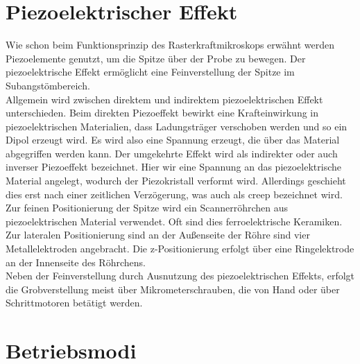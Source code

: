 \section{Piezoelektrischer Effekt}
Wie schon beim Funktionsprinzip des Rasterkraftmikroskops erwähnt werden Piezoelemente genutzt, um die Spitze über der Probe zu bewegen. Der piezoelektrische Effekt ermöglicht eine Feinverstellung der Spitze im Subangstömbereich.  \\
Allgemein wird zwischen direktem und indirektem piezoelektrischen Effekt unterschieden. Beim direkten Piezoeffekt bewirkt eine Krafteinwirkung in piezoelektrischen Materialien, dass Ladungsträger verschoben werden und so ein Dipol erzeugt wird. Es wird also eine Spannung erzeugt, die über das Material abgegriffen werden kann. Der umgekehrte Effekt wird als indirekter oder auch inverser Piezoeffekt bezeichnet. Hier wir eine Spannung an das piezoelektrische Material angelegt, wodurch der Piezokristall verformt wird. Allerdings geschieht dies erst nach einer zeitlichen Verzögerung, was auch als \dq creep \dq bezeichnet wird.  \\
Zur feinen Positionierung der Spitze wird ein Scannerröhrchen aus piezoelektrischen Material verwendet. Oft sind dies ferroelektrische Keramiken. Zur lateralen Positionierung sind an der Außenseite der Röhre sind vier Metallelektroden angebracht. Die z-Positionierung erfolgt über eine Ringelektrode an der Innenseite des Röhrchens.
\\
Neben der Feinverstellung durch Ausnutzung des piezoelektrischen Effekts, erfolgt die Grobverstellung meist über Mikrometerschrauben, die von Hand oder über Schrittmotoren betätigt werden.


\section{Betriebsmodi}
